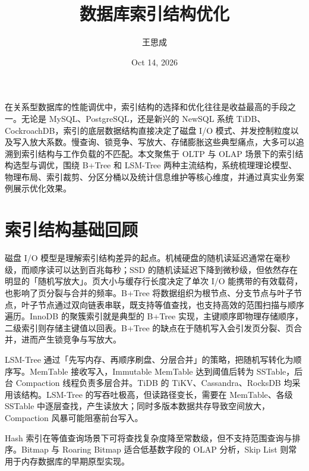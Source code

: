 \title{数据库索引结构优化}
\author{王思成}
\date{Oct 14, 2026}
\maketitle
在关系型数据库的性能调优中，索引结构的选择和优化往往是收益最高的手段之一。无论是 MySQL、PostgreSQL，还是新兴的 NewSQL 系统 TiDB、CockroachDB，索引的底层数据结构直接决定了磁盘 I/O 模式、并发控制粒度以及写入放大系数。慢查询、锁竞争、写放大、存储膨胀这些典型痛点，大多可以追溯到索引结构与工作负载的不匹配。本文聚焦于 OLTP 与 OLAP 场景下的索引结构选型与调优，围绕 B+Tree 和 LSM-Tree 两种主流结构，系统梳理理论模型、物理布局、索引裁剪、分区分桶以及统计信息维护等核心维度，并通过真实业务案例展示优化效果。\par
\chapter{索引结构基础回顾}
磁盘 I/O 模型是理解索引结构差异的起点。机械硬盘的随机读延迟通常在毫秒级，而顺序读可以达到百兆每秒；SSD 的随机读延迟下降到微秒级，但依然存在明显的「随机写放大」。页大小与缓存行长度决定了单次 I/O 能携带的有效载荷，也影响了页分裂与合并的频率。B+Tree 将数据组织为根节点、分支节点与叶子节点，叶子节点通过双向链表串联，既支持等值查找，也支持高效的范围扫描与顺序遍历。InnoDB 的聚簇索引就是典型的 B+Tree 实现，主键顺序即物理存储顺序，二级索引则存储主键值以回表。B+Tree 的缺点在于随机写入会引发页分裂、页合并，进而产生锁竞争与写放大。\par
LSM-Tree 通过「先写内存、再顺序刷盘、分层合并」的策略，把随机写转化为顺序写。MemTable 接收写入，Immutable MemTable 达到阈值后转为 SSTable，后台 Compaction 线程负责多层合并。TiDB 的 TiKV、Cassandra、RocksDB 均采用该结构。LSM-Tree 的写吞吐极高，但读路径变长，需要在 MemTable、各级 SSTable 中逐层查找，产生读放大；同时多版本数据共存导致空间放大，Compaction 风暴可能阻塞前台写入。\par
Hash 索引在等值查询场景下可将查找复杂度降至常数级，但不支持范围查询与排序。Bitmap 与 Roaring Bitmap 适合低基数字段的 OLAP 分析，Skip List 则常用于内存数据库的早期原型实现。\par
